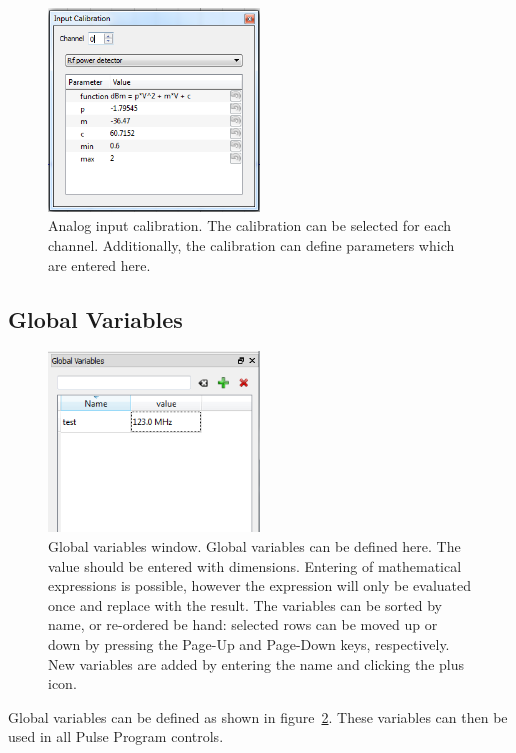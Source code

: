 \documentclass[11pt]{scrartcl}
\begin{document}
\begin{figure}
\centering
\includegraphics[width=0.5\textwidth]{AnalogInputCalibration}
\caption{\label{AnalogInputCalibration} Analog input calibration. The calibration can be selected for each channel. Additionally, the calibration can define parameters which are entered here.}
\end{figure}

\subsection{Global Variables}
\begin{figure}
\centering
\includegraphics[width=0.5\textwidth]{GlobalVariables}
\caption{\label{GlobalVariables} Global variables window. Global variables can be defined here. The value should be entered with dimensions. Entering of mathematical expressions is possible, however the expression will only be evaluated once and replace with the result. The variables can be sorted by name, or re-ordered be hand: selected rows can be moved up or down by pressing the Page-Up and Page-Down keys, respectively. New variables are added by entering the name and clicking the plus icon.}
\end{figure}

Global variables can be defined as shown in figure~\ref{GlobalVariables}. These variables can then be used in all Pulse Program controls.
\end{document}
